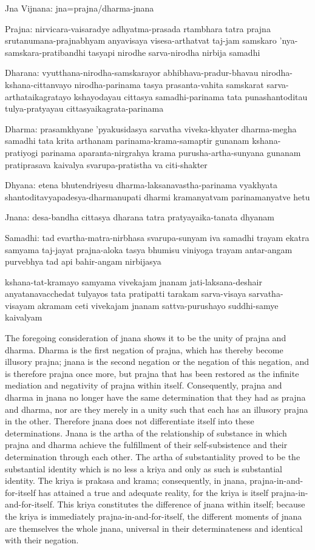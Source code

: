 Jna Vijnana:
jna=prajna/dharma-jnana

Prajna:
  nirvicara-vaisaradye adhyatma-prasada
  rtambhara tatra prajna
  srutanumana-prajnabhyam anyavisaya visesa-arthatvat
  taj-jam samskaro 'nya-samskara-pratibandhi
  tasyapi nirodhe sarva-nirodha nirbija samadhi

  Dharana:
    vyutthana-nirodha-samskarayor abhibhava-pradur-bhavau
    nirodha-kshana-cittanvayo nirodha-parinama
    tasya prasanta-vahita samskarat
    sarva-arthataikagratayo kshayodayau cittasya samadhi-parinama
    tata punashantoditau tulya-pratyayau cittasyaikagrata-parinama

Dharma:
  prasamkhyane 'pyakusidasya sarvatha viveka-khyater dharma-megha samadhi
  tata krita arthanam parinama-krama-samaptir gunanam
  kshana-pratiyogi parinama aparanta-nirgrahya krama
  purusha-artha-sunyana gunanam pratiprasava kaivalya
  svarupa-pratistha va citi-shakter

  Dhyana:
    etena bhutendriyesu dharma-laksanavastha-parinama vyakhyata
    shantoditavyapadesya-dharmanupati dharmi
    kramanyatvam parinamanyatve hetu

Jnana:
    desa-bandha cittasya dharana
    tatra pratyayaika-tanata dhyanam

  Samadhi:
    tad evartha-matra-nirbhasa svarupa-sunyam iva samadhi
    trayam ekatra samyama
    taj-jayat prajna-aloka
    tasya bhumisu viniyoga
    trayam antar-angam purvebhya
    tad api bahir-angam nirbijasya

    kshana-tat-kramayo samyama vivekajam jnanam
    jati-laksana-deshair anyatanavacchedat tulyayos tata pratipatti
    tarakam sarva-visaya sarvatha-visayam akramam ceti vivekajam jnanam
    sattva-purushayo suddhi-samye kaivalyam

The foregoing consideration of jnana shows it
to be the unity of prajna and dharma.
Dharma is the first negation of prajna,
which has thereby become illusory prajna;
jnana is the second negation
or the negation of this negation,
and is therefore prajna once more,
but prajna that has been restored as
the infinite mediation and negativity of
prajna within itself.
Consequently, prajna and dharma in jnana
no longer have the same determination
that they had as prajna and dharma,
nor are they merely in a unity such that
each has an illusory prajna in the other.
Therefore jnana does not differentiate
itself into these determinations.
Jnana is the artha of the relationship of substance
in which prajna and dharma achieve
the fulfillment of their self-subsistence
and their determination through each other.
The artha of substantiality proved to be the substantial identity
which is no less a kriya and only as such is substantial identity.
The kriya is prakasa and krama;
consequently, in jnana, prajna-in-and-for-itself
has attained a true and adequate reality,
for the kriya is itself prajna-in-and-for-itself.
This kriya constitutes the difference of jnana within itself;
because the kriya is immediately prajna-in-and-for-itself,
the different moments of jnana are themselves the whole jnana,
universal in their determinateness and identical with their negation.

